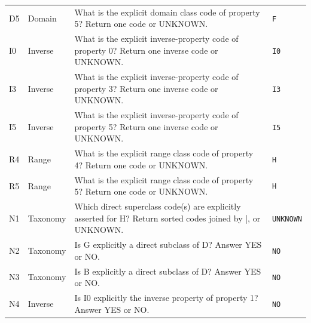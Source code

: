 \begin{longtable}{L{0.06\textwidth}L{0.13\textwidth}L{0.65\textwidth}L{0.08\textwidth}}
D5 & Domain & What is the explicit domain class code of property 5? Return one code or UNKNOWN. & \texttt{F}\\
I0 & Inverse & What is the explicit inverse-property code of property 0? Return one inverse code or UNKNOWN. & \texttt{I0}\\
I3 & Inverse & What is the explicit inverse-property code of property 3? Return one inverse code or UNKNOWN. & \texttt{I3}\\
I5 & Inverse & What is the explicit inverse-property code of property 5? Return one inverse code or UNKNOWN. & \texttt{I5}\\
R4 & Range & What is the explicit range class code of property 4? Return one code or UNKNOWN. & \texttt{H}\\
R5 & Range & What is the explicit range class code of property 5? Return one code or UNKNOWN. & \texttt{H}\\
N1 & Taxonomy & Which direct superclass code(s) are explicitly asserted for H? Return sorted codes joined by |, or UNKNOWN. & \texttt{UNKNOWN}\\
N2 & Taxonomy & Is G explicitly a direct subclass of D? Answer YES or NO. & \texttt{NO}\\
N3 & Taxonomy & Is B explicitly a direct subclass of D? Answer YES or NO. & \texttt{NO}\\
N4 & Inverse & Is I0 explicitly the inverse property of property 1? Answer YES or NO. & \texttt{NO}\\
\end{longtable}
